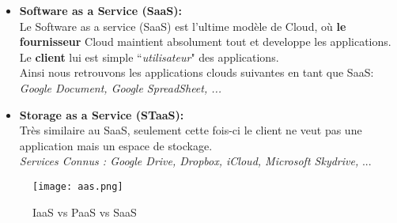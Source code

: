 \begin{itemize}
	
	\item \textbf{Software as a Service (SaaS):}\\
	
	Le Software as a service (SaaS) est l’ultime modèle de Cloud, où \textbf{le fournisseur} Cloud 
maintient absolument tout et developpe les applications.\\
	
	Le \textbf{client} lui est simple ``\emph{utilisateur}" des applications.\\
	
	Ainsi nous retrouvons les applications clouds suivantes en tant que SaaS: \emph{Google Document, Google SpreadSheet, ... }\\
			\vspace{8mm}

\item \textbf{Storage as a Service (STaaS):}\\

 Très similaire au SaaS, seulement cette fois-ci le client ne veut pas une application mais un espace de stockage.\\
 
 \emph{Services Connus : Google Drive, Dropbox, iCloud, Microsoft Skydrive,} ...

\end{itemize}
			\vspace{2cm}
 
\begin{figure}[H]
    \centering
    \texttt{[image: aas.png]}
	\caption{IaaS vs PaaS vs SaaS}\label{image.aas} 

\end{figure}